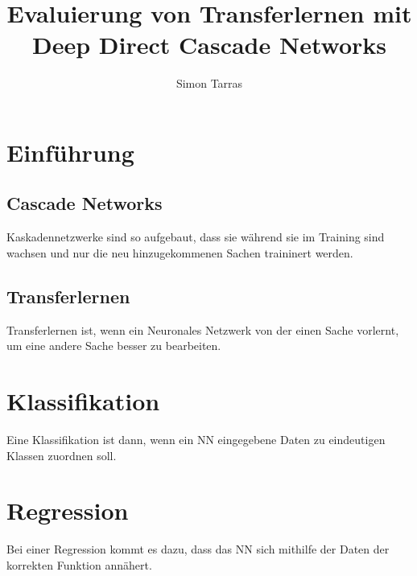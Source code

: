 \documentclass[ngerman]{report}
\title{Evaluierung von Transferlernen mit Deep Direct Cascade Networks}
\author{Simon Tarras}
\begin{document}
    \maketitle
    \chapter{Einführung}
        \section{Cascade Networks}
        Kaskadennetzwerke sind so aufgebaut, dass sie während sie 
        im Training sind wachsen und nur die neu hinzugekommenen 
        Sachen traininert werden.
        \section{Transferlernen}
        Transferlernen ist, wenn ein Neuronales Netzwerk von der 
        einen Sache vorlernt, um eine andere Sache besser zu 
        bearbeiten.
    \chapter{Klassifikation}
    Eine Klassifikation ist dann, wenn ein NN eingegebene Daten zu 
    eindeutigen Klassen zuordnen soll.
    \chapter{Regression}
    Bei einer Regression kommt es dazu, dass das NN sich mithilfe 
    der Daten der korrekten Funktion annähert.
\end{document}
